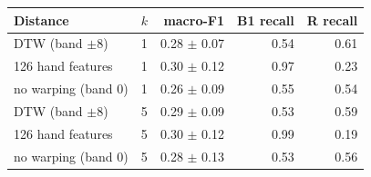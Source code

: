 \begin{tabular}{llrrr}
\toprule
Distance & $k$ & macro-F1 & B1 recall & R recall \\
\midrule
DTW (band $\pm$8) & 1 & 0.28 $\pm$ 0.07 & 0.54 & 0.61 \\
126 hand features & 1 & 0.30 $\pm$ 0.12 & 0.97 & 0.23 \\
no warping (band 0) & 1 & 0.26 $\pm$ 0.09 & 0.55 & 0.54 \\
DTW (band $\pm$8) & 5 & 0.29 $\pm$ 0.09 & 0.53 & 0.59 \\
126 hand features & 5 & 0.30 $\pm$ 0.12 & 0.99 & 0.19 \\
no warping (band 0) & 5 & 0.28 $\pm$ 0.13 & 0.53 & 0.56 \\
\bottomrule
\end{tabular}

